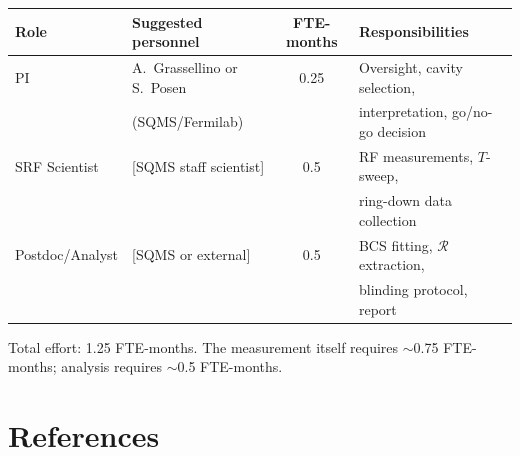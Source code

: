 \documentclass[11pt]{article}
\newcommand{\Rq}{\mathcal{R}}
\begin{document}
\begin{center}
\renewcommand{\arraystretch}{1.3}
\begin{tabular}{@{}llcl@{}}
\toprule
\textbf{Role} & \textbf{Suggested personnel} & \textbf{FTE-months} &
\textbf{Responsibilities} \\
\midrule
PI & A.~Grassellino or S.~Posen & 0.25 &
  Oversight, cavity selection, \\
  & (SQMS/Fermilab) & & interpretation, go/no-go decision \\
SRF Scientist & [SQMS staff scientist] & 0.5 &
  RF measurements, $T$-sweep, \\
  & & & ring-down data collection \\
Postdoc/Analyst & [SQMS or external] & 0.5 &
  BCS fitting, $\Rq$ extraction, \\
  & & & blinding protocol, report \\
\bottomrule
\end{tabular}
\end{center}

Total effort: 1.25 FTE-months. The measurement itself requires
$\sim$0.75 FTE-months; analysis requires $\sim$0.5 FTE-months.


\section{References}
\label{sec:references}
\end{document}
